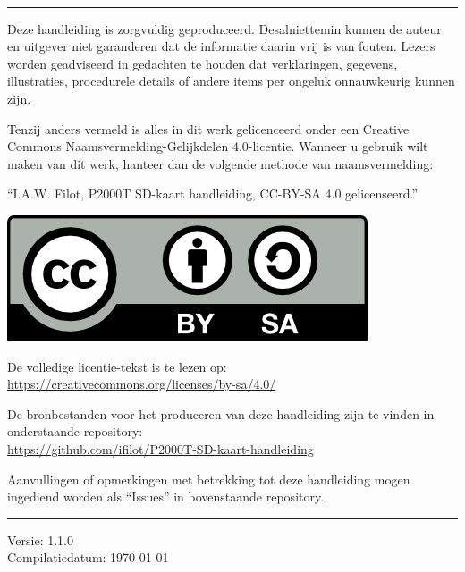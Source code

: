 ~\vfill

\begin{minipage}{1.0\textwidth}

\thispagestyle{empty}
\setlength{\parindent}{0pt}
\setlength{\parskip}{\baselineskip}

\noindent\rule{1.0\textwidth}{0.4pt}

Deze handleiding is zorgvuldig geproduceerd. Desalniettemin kunnen de auteur en uitgever niet garanderen dat de informatie daarin vrij is van fouten. Lezers worden geadviseerd in gedachten te houden dat verklaringen, gegevens, illustraties, procedurele details of andere items per ongeluk onnauwkeurig kunnen zijn.

Tenzij anders vermeld is alles in dit werk gelicenceerd onder een Creative Commons Naamsvermelding-Gelijkdelen 4.0-licentie. Wanneer u gebruik wilt maken van dit werk, hanteer dan de volgende methode van naamsvermelding:

``I.A.W. Filot, P2000T SD-kaart handleiding, CC-BY-SA 4.0 gelicenseerd.'' 

\includegraphics[]{img/by-sa.png}

De volledige licentie-tekst is te lezen op:\\
\url{https://creativecommons.org/licenses/by-sa/4.0/}

De bronbestanden voor het produceren van deze handleiding zijn te vinden in onderstaande repository:\\
\faGithub\;\url{https://github.com/ifilot/P2000T-SD-kaart-handleiding}

Aanvullingen of opmerkingen met betrekking tot deze handleiding mogen ingediend worden als ``Issues'' in bovenstaande repository.

\noindent\rule{1.0\textwidth}{0.4pt}
Versie: 1.1.0\\
Compilatiedatum: \today

\end{minipage}

\newpage

